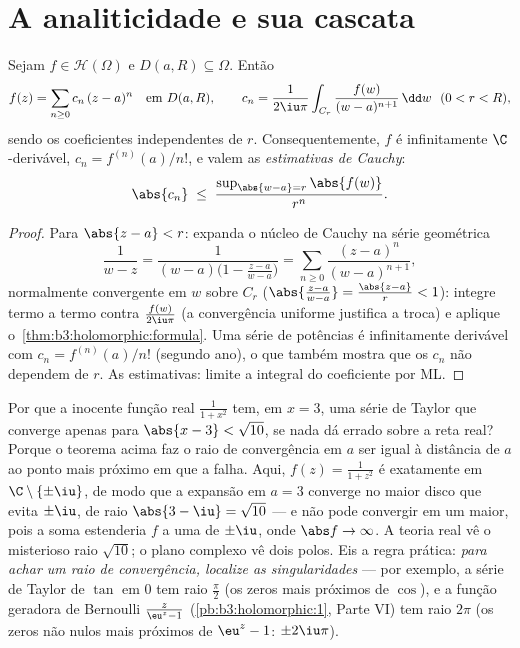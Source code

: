 \section{A analiticidade e sua cascata}

\begin{theorem}[Holomorfa $=$ analítica]
\label{thm:b3:holomorphic:analytic}
Sejam $f \in \mathcal H(\Omega)$ e $D(a, R) \subseteq \Omega$. Então
\[
f(z) = \sum_{n\geq0}c_n\,(z - a)^n \quad \text{em } D(a, R),
\qquad
c_n = \frac1{2\iu\pi}\int_{C_r}\frac{f(w)}{(w -
a)^{n+1}}\,\dd w \ \ (0 < r < R),
\]
sendo os coeficientes independentes de $r$. Consequentemente,
$f$ é infinitamente $\C$-derivável, $c_n = f^{(n)}(a)/n!$, e valem as
\emph{estimativas de Cauchy}:
\[
\abs{c_n} \;\leq\; \frac{\sup_{\abs{w - a} =
r}\abs{f(w)}}{r^{n}} .
\]
\end{theorem}

\begin{proof}
Para $\abs{z - a} < r$: expanda o núcleo de Cauchy na série geométrica
\[
\frac1{w - z} = \frac1{(w - a)\bigl(1 - \frac{z - a}{w -
a}\bigr)} = \sum_{n\geq0}\frac{(z - a)^n}{(w - a)^{n+1}},
\]
normalmente convergente em $w$ sobre $C_r$ ($\abs{\frac{z-a}{w-a}} =
\frac{\abs{z-a}}r < 1$): integre termo
a termo contra $\frac{f(w)}{2\iu\pi}$ (a convergência uniforme justifica a troca) e
aplique o~\cref{thm:b3:holomorphic:formula}. Uma série de potências é infinitamente
derivável com $c_n =
f^{(n)}(a)/n!$ (segundo ano), o que também mostra que os $c_n$
não dependem de $r$. As estimativas: limite a integral do
coeficiente por ML.
\end{proof}

\begin{example}
\label{ex:b3:holomorphic:radius}
Por que a inocente função real $\frac1{1 + x^2}$ tem, em $x = 3$, uma série de
Taylor que converge apenas para $\abs{x - 3} <
\sqrt{10}$, se nada dá errado sobre a reta
real? Porque o teorema acima faz o raio de convergência em $a$ ser
igual à distância de $a$ ao ponto mais próximo em que a 
falha. Aqui, $f(z) = \frac1{1 + z^2}$ é  exatamente em $\C\setminus\{\pm\iu\}$, de modo que a
expansão em $a = 3$ converge no maior disco que evita $\pm\iu$,
de raio $\abs{3 - \iu} = \sqrt{10}$ --- e não pode convergir em um maior, pois a soma
estenderia $f$  a uma  de $\pm\iu$,
onde $\abs f \to \infty$. A teoria real vê o misterioso raio $\sqrt{10}$; o plano complexo
vê dois polos. Eis a regra prática: \emph{para achar um raio de
convergência, localize as singularidades} --- por exemplo, a série de
Taylor de $\tan$ em $0$ tem raio $\frac\pi2$ (os zeros mais próximos
de $\cos$), e a função geradora de Bernoulli $\frac z{\eu^z - 1}$
(\cref{pb:b3:holomorphic:1}, Parte VI) tem raio $2\pi$ (os zeros não nulos mais
próximos de $\eu^z - 1$: $\pm2\iu\pi$).
\end{example}

